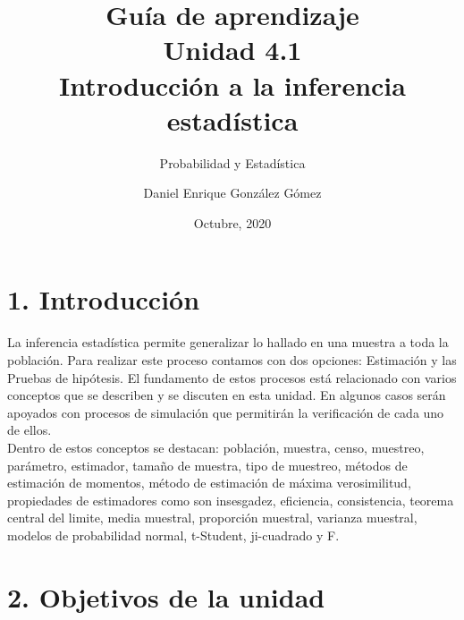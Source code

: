 \documentclass[base=hide,11pt]{elegantbook}
\title{Guía de  aprendizaje\\
	Unidad  4.1 \\
	Introducción a la inferencia estadística }
\subtitle{Probabilidad y Estadística}
\author{Daniel Enrique González Gómez}
\institute{Pontificia Universidad Javeriana Cali}
\date{Octubre, 2020}
\begin{document}

\maketitle

\frontmatter
%
\mainmatter

\section*{1. Introducción}

La inferencia estadística permite generalizar lo hallado en una muestra a toda la población. Para realizar este proceso contamos con dos opciones: Estimación y las Pruebas de hipótesis. El fundamento de estos procesos está relacionado con varios conceptos que se describen y se discuten en esta unidad. En algunos casos serán apoyados con procesos de simulación que permitirán la verificación de cada uno de ellos. \\
 
Dentro de estos conceptos se destacan: población, muestra, censo, muestreo, parámetro, estimador, tamaño de muestra, tipo de muestreo, métodos de estimación de momentos, método de estimación de máxima verosimilitud, propiedades de estimadores como son insesgadez, eficiencia, consistencia, teorema central del limite, media muestral, proporción muestral, varianza muestral, modelos de probabilidad normal, t-Student, ji-cuadrado y F.



\section*{2. Objetivos de la unidad}
\end{document}
